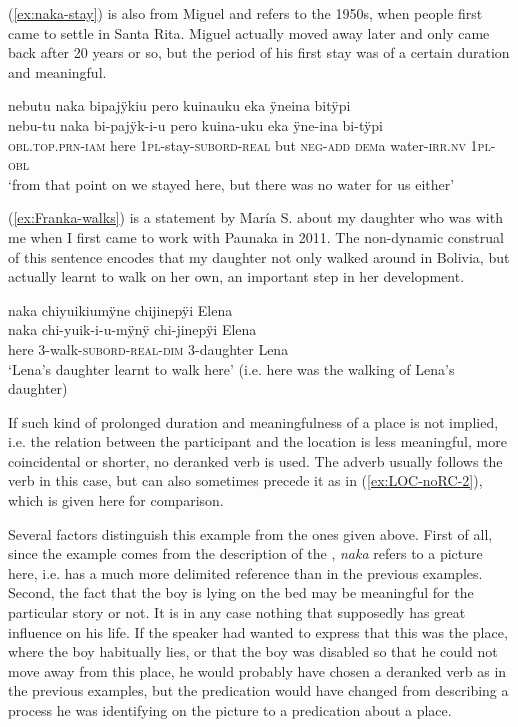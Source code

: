 (\ref{ex:naka-stay}) is also from Miguel and refers to the 1950s, when people first came to settle in Santa Rita. Miguel actually moved away later and only came back after 20 years or so, but the period of his first stay was of a certain duration and meaningful.

\newpage

\ea\label{ex:naka-stay}
\begingl
\glpreamble nebutu naka bipajÿkiu pero kuinauku eka ÿneina bitÿpi\\
\gla nebu-tu naka bi-pajÿk-i-u pero kuina-uku eka ÿne-ina bi-tÿpi\\
\textsc{obl.top.prn}-\textsc{iam} here 1\textsc{pl}-stay-\textsc{subord}-\textsc{real} but \textsc{neg}-\textsc{add} \textsc{dem}a water-\textsc{irr.nv} 1\textsc{pl}-\textsc{obl}\\
\glft ‘from that point on we stayed here, but there was no water for us either’
\endgl
\trailingcitation{[mxx-p110825l.060]}
\xe

(\ref{ex:Franka-walks}) is a statement by María S. about my daughter who was with me when I first came to work with Paunaka in 2011. The non-dynamic construal of this sentence encodes that my daughter not only walked around in Bolivia, but actually learnt to walk on her own, an important step in her development.

\ea\label{ex:Franka-walks}
\begingl
\glpreamble naka chiyuikiumÿne chijinepÿi Elena\\
\gla naka chi-yuik-i-u-mÿnÿ chi-jinepÿi Elena\\
\glb here 3-walk-\textsc{subord}-\textsc{real}-\textsc{dim} 3-daughter Lena\\
\glft ‘Lena’s daughter learnt to walk here’ (i.e. here was the walking of Lena’s daughter)
\endgl
\trailingcitation{[rxx-e121128s-1.069]}
\xe

If such kind of prolonged duration and meaningfulness of a place is not implied, i.e. the relation between the participant and the location is less meaningful, more coincidental or shorter, no deranked verb is used. The adverb usually follows the verb in this case, but can also sometimes precede it as in (\ref{ex:LOC-noRC-2}), which is given here for comparison.

Several factors distinguish this example from the ones given above. First of all, since the example comes from the description of the , \textit{naka} refers to a picture here, i.e. has a much more delimited reference than in the previous examples. Second, the fact that the boy is lying on the bed may be meaningful for the particular story or not. It is in any case nothing that supposedly has great influence on his life. If the speaker had wanted to express that this was the place, where the boy habitually lies, or that the boy was disabled so that he could not move away from this place, he would probably have chosen a deranked verb as in the previous examples, but the predication would have changed from describing a process he was identifying on the picture to a predication about a place. 

